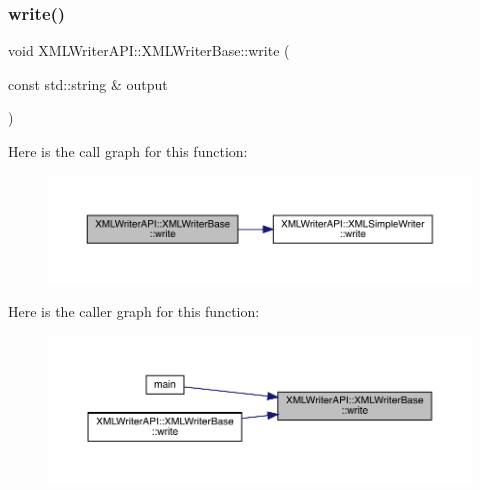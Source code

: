 \subsubsection{\texorpdfstring{write()}{write()}\hspace{0.1cm}{\footnotesize\ttfamily [1/39]}}
{\footnotesize\ttfamily void X\+M\+L\+Writer\+A\+P\+I\+::\+X\+M\+L\+Writer\+Base\+::write (\begin{DoxyParamCaption}\item[{const std\+::string \&}]{output }\end{DoxyParamCaption})\hspace{0.3cm}{\ttfamily [inline]}}

Here is the call graph for this function\+:
\nopagebreak
\begin{figure}[H]
\begin{center}
\leavevmode
\includegraphics[width=350pt]{d5/df5/classXMLWriterAPI_1_1XMLWriterBase_abc9cd8491179aa022c9b63053f3a7ff8_cgraph}
\end{center}
\end{figure}
Here is the caller graph for this function\+:
\nopagebreak
\begin{figure}[H]
\begin{center}
\leavevmode
\includegraphics[width=350pt]{d5/df5/classXMLWriterAPI_1_1XMLWriterBase_abc9cd8491179aa022c9b63053f3a7ff8_icgraph}
\end{center}
\end{figure}
\mbox{\label{classXMLWriterAPI_1_1XMLWriterBase_abc9cd8491179aa022c9b63053f3a7ff8}} 
